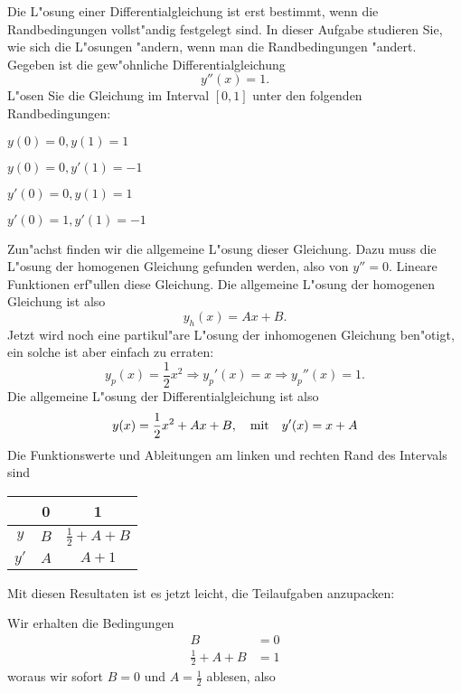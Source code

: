 Die L"osung einer Differentialgleichung ist erst bestimmt, wenn
die Randbedingungen vollst"andig festgelegt sind. In dieser Aufgabe
studieren Sie, wie sich die L"osungen "andern, wenn man die Randbedingungen
"andert. Gegeben ist die gew"ohnliche Differentialgleichung
\[
y''(x)=1.
\]
L"osen Sie die Gleichung im Interval $[0,1]$
unter den folgenden Randbedingungen:
\begin{teilaufgaben}
\item $y(0)=0, y(1)=1$
\item $y(0)=0, y'(1)=-1$
\item $y'(0)=0, y(1)=1$
\item $y'(0)=1, y'(1)=-1$
\end{teilaufgaben}

\begin{loesung}
Zun"achst finden wir die allgemeine L"osung dieser Gleichung.
Dazu muss die L"osung der homogenen Gleichung gefunden werden,
also von $y''=0$. Lineare Funktionen erf"ullen diese Gleichung.
Die allgemeine L"osung der homogenen Gleichung ist also
\[
y_h(x)=Ax+B.
\]
Jetzt wird noch eine partikul"are L"osung der inhomogenen
Gleichung ben"otigt, ein solche ist aber einfach zu
erraten:
\[
y_p(x)=\frac12x^2\Rightarrow y_p'(x)=x\Rightarrow y_p''(x)=1.
\]
Die allgemeine L"osung der Differentialgleichung ist also
\[
y(x)=\frac12x^2+Ax+B, \text{\quad mit\quad} y'(x)=x+A
\]
Die Funktionswerte und Ableitungen am linken und rechten
Rand des Intervals sind
\begin{center}
\begin{tabular}{|c|cc|}
\hline
&0&1\\
\hline
$y$&$B$&$\frac12 +A+B$\\
$y'$&$A$&$A+1$\\
\hline
\end{tabular}
\end{center}
Mit diesen Resultaten ist es jetzt leicht, die Teilaufgaben anzupacken:
\begin{teilaufgaben}
\item Wir erhalten die Bedingungen
\begin{align*}
B&=0\\
\frac12+A+B&=1
\end{align*}
woraus wir sofort $B=0$ und $A=\frac12$ ablesen, also

\end{teilaufgaben}
\end{loesung}
